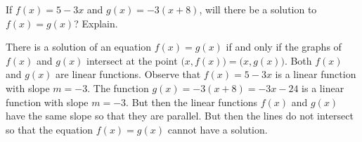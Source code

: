 \documentclass[11pt,letterpaper]{article}
\begin{document}
\newpage



 If $f(x)= 5 - 3x$ and $g(x)= -3(x + 8)$, will there be a solution to $f(x)= g(x)$? Explain. \pspace

\sol There is a solution of an equation $f(x)= g(x)$ if and only if the graphs of $f(x)$ and $g(x)$ intersect at the point $\big(x, f(x) \big)= \big(x, g(x) \big)$. Both $f(x)$ and $g(x)$ are linear functions. Observe that $f(x)= 5 - 3x$ is a linear function with slope $m= -3$. The function $g(x)= -3(x + 8)= -3x - 24$ is a linear function with slope $m= -3$. But then the linear functions $f(x)$ and $g(x)$ have the same slope so that they are parallel. But then the lines do not intersect so that the equation $f(x)= g(x)$ cannot have a solution. 
\end{document}
